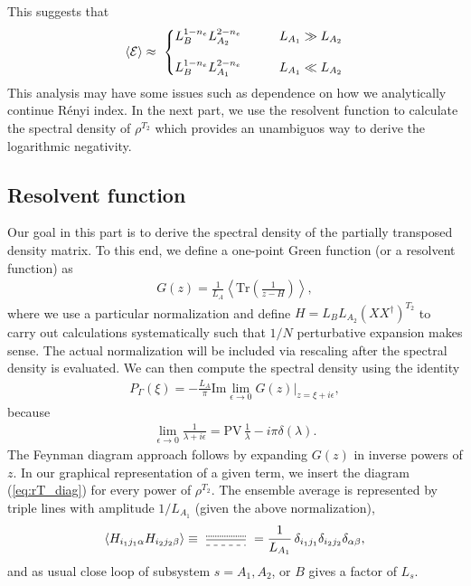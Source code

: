 \documentclass[aps,pra,groupedaddress,twocolumn,notitlepage,superscriptaddress,10pt]{revtex4-1}
\newcommand{\rT}{{\rho^{T_2}} }
\newcommand{\rTc}{{\rho^{T_2}} }
\newcommand{\Tr}{\text{Tr}}
\begin{document}
This suggests that
\begin{align}
    \braket{\cal E} \approx \ 
    \left\{
    \begin{matrix}
    L_{B}^{1-n_e} L_{A_2}^{2-n_e} & \qquad  L_{A_1} \gg L_{A_2}
    \\
    \\
    L_{B}^{1-n_e} L_{A_1}^{2-n_e} & \qquad  L_{A_1} \ll L_{A_2}
    \end{matrix}
    \right.
\end{align}
This analysis may have some issues such as dependence on how we analytically continue R\'enyi index.
In the next part, we use the resolvent function to calculate the spectral density of $\rT$ which provides an unambiguos way to derive the logarithmic negativity.

\subsection{Resolvent function}

Our goal in this part is to derive the spectral density of the partially transposed density matrix.
To this end, we define a one-point Green function (or a resolvent function) as
\begin{align}
    G(z)=\frac{1}{L_A} \left\langle \Tr\left( \frac{1}{z-H}\right) \right\rangle,
\end{align}
where we use a particular normalization and define $H=L_B L_{A_2} (XX^\dag)^{T_2}$ to carry out calculations systematically such that $1/N$ perturbative expansion makes sense. 
The actual normalization will be included via rescaling after the spectral density is evaluated. We can then compute the spectral density using the identity
\begin{align}
    \label{eq:dos}
    P_\Gamma(\xi)= - \frac{L_A}{\pi} \text{Im} \lim_{\epsilon\to 0} G(z)\big|
    _{z=\xi + i\epsilon},
\end{align}
because
\begin{align}
    \lim_{\epsilon\to 0} \frac{1}{\lambda + i\epsilon} = \text{PV}\, \frac{1}{\lambda} - i \pi \delta(\lambda).
\end{align}
The Feynman diagram approach follows by expanding $G(z)$ in inverse powers of $z$. In our graphical representation of a given term, we insert the diagram (\ref{eq:rT_diag}) for every power of $\rTc$. 
The ensemble average is represented by triple lines with amplitude $1/L_{A_1}$ (given the above normalization),
\begin{align}
\braket{H_{i_1 j_1 \alpha} H_{i_2 j_2 \beta}} \equiv
\
\tikz[baseline=-0.8ex,scale=1]{
    \draw[densely dotted,thick] (0,0.05)--(1.1,0.05);
    \draw (0,-0.05)--(1.1,-0.05);
    \draw[dashed] (0,-0.2)--(1.1,-0.2);
    }
    \ 
    =\frac{1}{L_{A_1}}\, \delta_{i_1 j_1} \delta_{i_2 j_2} \delta_{\alpha\beta},
\end{align} 
and as usual close loop of subsystem $s=A_1,A_2$, or $B$ gives a factor of $L_s$.
\end{document}
